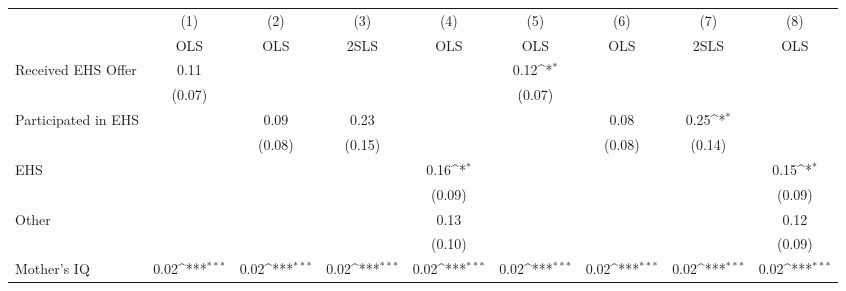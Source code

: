 {
\def\sym#1{\ifmmode^{#1}\else\(^{#1}\)\fi}
\begin{tabular}{l*{8}{c}}
\hline\hline
                    &\multicolumn{1}{c}{(1)}&\multicolumn{1}{c}{(2)}&\multicolumn{1}{c}{(3)}&\multicolumn{1}{c}{(4)}&\multicolumn{1}{c}{(5)}&\multicolumn{1}{c}{(6)}&\multicolumn{1}{c}{(7)}&\multicolumn{1}{c}{(8)}\\
                    &\multicolumn{1}{c}{OLS}&\multicolumn{1}{c}{OLS}&\multicolumn{1}{c}{2SLS}&\multicolumn{1}{c}{OLS}&\multicolumn{1}{c}{OLS}&\multicolumn{1}{c}{OLS}&\multicolumn{1}{c}{2SLS}&\multicolumn{1}{c}{OLS}\\
\hline
Received EHS Offer  &        0.11         &                     &                     &                     &        0.12\sym{*}  &                     &                     &                     \\
                    &      (0.07)         &                     &                     &                     &      (0.07)         &                     &                     &                     \\
[1em]
Participated in EHS &                     &        0.09         &        0.23         &                     &                     &        0.08         &        0.25\sym{*}  &                     \\
                    &                     &      (0.08)         &      (0.15)         &                     &                     &      (0.08)         &      (0.14)         &                     \\
[1em]
EHS                 &                     &                     &                     &        0.16\sym{*}  &                     &                     &                     &        0.15\sym{*}  \\
                    &                     &                     &                     &      (0.09)         &                     &                     &                     &      (0.09)         \\
[1em]
Other               &                     &                     &                     &        0.13         &                     &                     &                     &        0.12         \\
                    &                     &                     &                     &      (0.10)         &                     &                     &                     &      (0.09)         \\
[1em]
Mother's IQ         &        0.02\sym{***}&        0.02\sym{***}&        0.02\sym{***}&        0.02\sym{***}&        0.02\sym{***}&        0.02\sym{***}&        0.02\sym{***}&        0.02\sym{***}\\

\end{tabular}}
